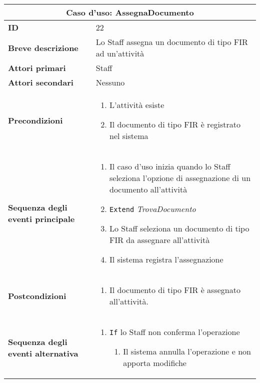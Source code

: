 \documentclass[a4paper]{report}
\begin{document}
\clearpage
\begin{table}[H]
\vspace*{-0cm}
\renewcommand{\arraystretch}{1.9}
\begin{tabular}{|p{3.9cm}|p{9.9cm}|}
\hline
\multicolumn{2}{|c|}{\textbf{Caso d’uso: AssegnaDocumento}} \\ \hline
	\textbf{ID} & 22 \\ \hline
	\textbf{Breve descrizione} & Lo Staff assegna un documento di tipo FIR ad un’attività \\ \hline
	\textbf{Attori primari} & Staff \\ \hline
	\textbf{Attori secondari} & Nessuno \\ \hline
	\textbf{Precondizioni} & \begin{enumerate}[leftmargin=14pt,label=\arabic*.,labelsep=0.5em,topsep=0pt,partopsep=0pt,parsep=0pt,itemsep=0pt]
    \item L’attività esiste
    \item Il documento di tipo FIR è registrato nel sistema
\end{enumerate} \\ \hline
	\textbf{Sequenza degli eventi principale} & \begin{enumerate}[leftmargin=14pt,label=\arabic*.,labelsep=0.5em,topsep=0pt,partopsep=0pt,parsep=0pt,itemsep=0pt]
    \item Il caso d'uso inizia quando lo Staff seleziona l'opzione di assegnazione di un documento all'attività
    \item \texttt{Extend} \textit{TrovaDocumento}
    \item Lo Staff seleziona un documento di tipo FIR da assegnare all'attività
    \item Il sistema registra l’assegnazione
\end{enumerate} \\ \hline
	\textbf{Postcondizioni} & \begin{enumerate}[label=\arabic*.,leftmargin=14pt,labelsep=0.5em,topsep=0pt,partopsep=0pt,parsep=0pt,itemsep=0pt]
        \item Il documento di tipo FIR è assegnato all’attività.
    \end{enumerate} \\ \hline
	\textbf{Sequenza degli eventi alternativa} & \begin{enumerate}[leftmargin=14pt,label=\arabic*.,labelsep=0.5em,topsep=0pt,partopsep=0pt,parsep=0pt,itemsep=0pt]
    \item \texttt{If} lo Staff non conferma l’operazione
    \begin{enumerate}[label=\arabic{enumi}.\arabic*.,leftmargin=22pt,labelsep=0.5em,topsep=0pt,partopsep=0pt,parsep=0pt,itemsep=0pt]
        \item Il sistema annulla l’operazione e non apporta modifiche
    \end{enumerate}
\end{enumerate} \\ \hline
\end{tabular}
\end{table}
\end{document}

